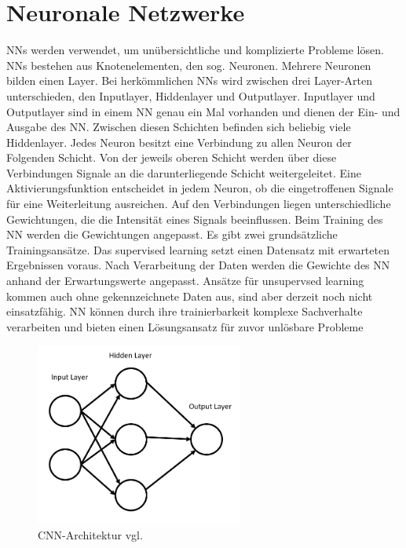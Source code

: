 \section{Neuronale Netzwerke}
NNs werden verwendet, um unübersichtliche und komplizierte Probleme lösen. NNs bestehen aus Knotenelementen, den sog. Neuronen. Mehrere Neuronen bilden einen Layer. Bei herkömmlichen NNs wird zwischen drei Layer-Arten unterschieden, den Inputlayer, Hiddenlayer und Outputlayer. Inputlayer und Outputlayer sind in einem NN genau ein Mal vorhanden und dienen der Ein- und Ausgabe des NN. Zwischen diesen Schichten befinden sich beliebig viele Hiddenlayer. Jedes Neuron besitzt eine Verbindung zu allen Neuron der Folgenden Schicht. Von der jeweils oberen Schicht werden über diese Verbindungen Signale an die darunterliegende Schicht weitergeleitet. Eine Aktivierungsfunktion entscheidet in jedem Neuron, ob die eingetroffenen Signale für eine Weiterleitung ausreichen. Auf den Verbindungen liegen unterschiedliche Gewichtungen, die die Intensität eines Signals beeinflussen. Beim Training des NN werden die Gewichtungen angepasst.
Es gibt zwei grundsätzliche Trainingsansätze. Das supervised learning setzt einen Datensatz mit erwarteten Ergebnissen voraus. Nach Verarbeitung der Daten werden die Gewichte des NN anhand der Erwartungswerte angepasst. Ansätze für unsupervsed learning kommen auch ohne gekennzeichnete Daten aus, sind aber derzeit noch nicht einsatzfähig. NN können durch ihre trainierbarkeit komplexe Sachverhalte verarbeiten und bieten einen Lösungsansatz für zuvor unlösbare Probleme~\cite{Maind2014}\\
\vspace{6.0cm}
\begin{figure}[h]
\includegraphics[width=\linewidth, height=6cm]{Bilder/NN/NeuralNetwork.png}
\caption{CNN-Architektur vgl. \cite{Maind2014}}
\end{figure}
\\


